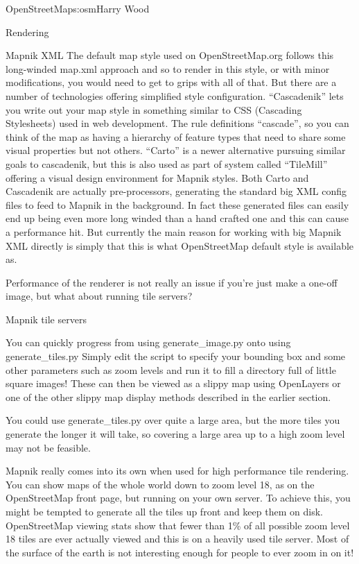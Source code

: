 \begin{aosachapter}{OpenStreetMap}{s:osm}{Harry Wood}
\begin{aosasect1}{Rendering}
\begin{aosasect2}{Mapnik XML}
The default map style used on OpenStreetMap.org follows this
long-winded map.xml approach and so to render in this style, or with
minor modifications, you would need to get to grips with all of
that. But there are a number of technologies offering simplified style
configuration. ``Cascadenik'' lets you write out your map style in
something similar to CSS (Cascading Stylesheets) used in web
development. The rule definitions ``cascade'', so you can think of the
map as having a hierarchy of feature types that need to share some
visual properties but not others. ``Carto'' is a newer alternative
pursuing similar goals to cascadenik, but this is also used as part of
system called ``TileMill'' offering a visual design environment for
Mapnik styles. Both Carto and Cascadenik are actually pre-processors,
generating the standard big XML config files to feed to Mapnik in the
background. In fact these generated files can easily end up being even
more long winded than a hand crafted one and this can cause a
performance hit. But currently the main reason for working with big
Mapnik XML directly is simply that this is what OpenStreetMap default
style is available as.

Performance of the renderer is not really an issue if you're just make
a one-off image, but what about running tile servers?

\end{aosasect2}

\begin{aosasect2}{Mapnik tile servers}

You can quickly progress from using generate\_image.py onto using
generate\_tiles.py Simply edit the script to specify your bounding box
and some other parameters such as zoom levels and run it to fill a
directory full of little square images! These can then be viewed as a
slippy map using OpenLayers or one of the other slippy map display
methods described in the earlier section.

You could use generate\_tiles.py over quite a large area, but the more
tiles you generate the longer it will take, so covering a large area
up to a high zoom level may not be feasible.

Mapnik really comes into its own when used for high performance tile
rendering. You can show maps of the whole world down to zoom level 18,
as on the OpenStreetMap front page, but running on your own server. To
achieve this, you might be tempted to generate all the tiles up front
and keep them on disk. OpenStreetMap viewing stats show that fewer
than 1\% of all possible zoom level 18 tiles are ever actually viewed
and this is on a heavily used tile server. Most of the surface of the
earth is not interesting enough for people to ever zoom in on it!


\end{aosasect2}
\end{aosasect1}
\end{aosachapter}
